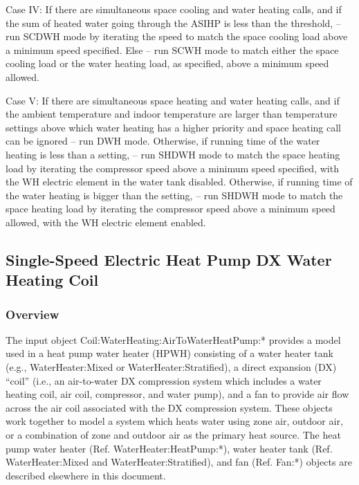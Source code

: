Case IV:
If there are simultaneous space cooling and water heating calls, and if the sum of heated water going through the ASIHP is less than the threshold, – run SCDWH mode by iterating the speed to match the space cooling load above a minimum speed specified.
Else – run SCWH mode to match either the space cooling load or the water heating load, as specified, above a minimum speed allowed.

Case V: 
If there are simultaneous space heating and water heating calls, and if the ambient temperature and indoor temperature are larger than temperature settings above which water heating has a higher priority and space heating call can be ignored – run DWH mode.
Otherwise, if running time of the water heating is less than a setting, – run SHDWH mode to match the space heating load by iterating the compressor speed above a minimum speed specified, with the WH electric element in the water tank disabled.
Otherwise, if running time of the water heating is bigger than the setting, – run SHDWH mode to match the space heating load by iterating the compressor speed above a minimum speed allowed, with the WH electric element enabled.




\subsection{Single-Speed Electric Heat Pump DX Water Heating Coil}\label{single-speed-electric-heat-pump-dx-water-heating-coil}

\subsubsection{Overview}\label{overview-11}

The input object Coil:WaterHeating:AirToWaterHeatPump:* provides a model used in a heat pump water heater (HPWH) consisting of a water heater tank (e.g., WaterHeater:Mixed or WaterHeater:Stratified), a direct expansion (DX) ``coil'' (i.e., an air-to-water DX compression system which includes a water heating coil, air coil, compressor, and water pump), and a fan to provide air flow across the air coil associated with the DX compression system. These objects work together to model a system which heats water using zone air, outdoor air, or a combination of zone and outdoor air as the primary heat source. The heat pump water heater (Ref. WaterHeater:HeatPump:*), water heater tank (Ref. WaterHeater:Mixed and WaterHeater:Stratified), and fan (Ref. Fan:*) objects are described elsewhere in this document.

